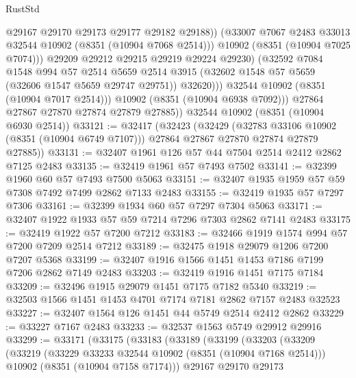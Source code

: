 \begin{lexlean}{RustStd}
\begin{coremodule}
                        @29167
                        @29170
                        @29173
                        @29177
                        @29182
                        @29188))
                    (@33007 @7067 @2483 @33013 @32544 @10902 (@8351 (@10904 @7068 @2514)))
                    @10902
                    (@8351 (@10904 @7025 @7074)))
                  @29209
                  @29212
                  @29215
                  @29219
                  @29224
                  @29230)
                (@32592
                  @7084
                  @1548
                  @994
                  @57
                  @2514
                  @5659
                  @2514
                  @3915
                  (@32602 @1548 @57 @5659 (@32606 @1547 @5659 @29747 @29751))
                  @32620)))
            @32544
            @10902
            (@8351 (@10904 @7017 @2514)))
          @10902
          (@8351 (@10904 @6938 @7092)))
        @27864
        @27867
        @27870
        @27874
        @27879
        @27885))
    @32544
    @10902
    (@8351 (@10904 @6930 @2514))
@33121 := @32417
    (@32423
      (@32429
        (@32783 @33106 @10902 (@8351 (@10904 @6749 @7107)))
        @27864
        @27867
        @27870
        @27874
        @27879
        @27885))
@33131 := @32407 @1961 @126 @57 @44 @7504 @2514 @2412 @2862 @7125 @2483
@33135 := @32419 @1961 @57 @7493 @7502
@33141 := @32399 @1960 @60 @57 @7493 @7500 @5063
@33151 := @32407 @1935 @1959 @57 @59 @7308 @7492 @7499 @2862 @7133 @2483
@33155 := @32419 @1935 @57 @7297 @7306
@33161 := @32399 @1934 @60 @57 @7297 @7304 @5063
@33171 := @32407 @1922 @1933 @57 @59 @7214 @7296 @7303 @2862 @7141 @2483
@33175 := @32419 @1922 @57 @7200 @7212
@33183 := @32466 @1919 @1574 @994 @57 @7200 @7209 @2514 @7212
@33189 := @32475 @1918 @29079 @1206 @7200 @7207 @5368
@33199 := @32407 @1916 @1566 @1451 @1453 @7186 @7199 @7206 @2862 @7149 @2483
@33203 := @32419 @1916 @1451 @7175 @7184
@33209 := @32496 @1915 @29079 @1451 @7175 @7182 @5340
@33219 := @32503 @1566 @1451 @1453 @4701 @7174 @7181 @2862 @7157 @2483 @32523
@33227 := @32407 @1564 @126 @1451 @44 @5749 @2514 @2412 @2862
@33229 := @33227 @7167 @2483
@33233 := @32537 @1563 @5749 @29912 @29916
@33299 := @33171
    (@33175
      (@33183
        (@33189
          (@33199
            (@33203
              (@33209
                (@33219
                  (@33229 @33233 @32544 @10902 (@8351 (@10904 @7168 @2514)))
                  @10902
                  (@8351 (@10904 @7158 @7174)))
                @29167
                @29170
                @29173

\end{coremodule}
\end{lexlean}
